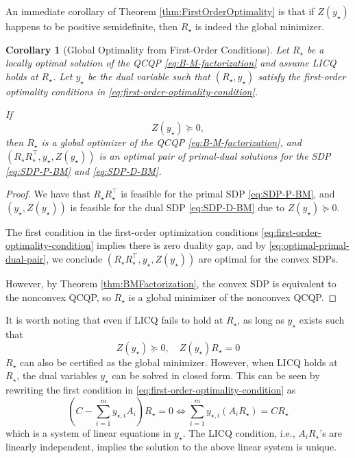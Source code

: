 \documentclass[
]{book}
\newtheorem{corollary}{Corollary}[chapter]
\theoremstyle{definition}
\theoremstyle{definition}
\theoremstyle{definition}
\theoremstyle{definition}
\theoremstyle{remark}
\begin{document}
An immediate corollary of Theorem \ref{thm:FirstOrderOptimality} is that if \(Z(y_\star)\) happens to be positive semidefinite, then \(R_\star\) is indeed the global minimizer.

\begin{corollary}[Global Optimality from First-Order Conditions]
\protect\hypertarget{cor:GlobalOptimality}{}\label{cor:GlobalOptimality}Let \(R_\star\) be a locally optimal solution of the QCQP \eqref{eq:B-M-factorization} and assume LICQ holds at \(R_\star\). Let \(y_\star\) be the dual variable such that \((R_\star,y_\star)\) satisfy the first-order optimality conditions in \eqref{eq:first-order-optimality-condition}.

If
\[
Z(y_\star) \succeq 0,
\]
then \(R_\star\) is a global optimizer of the QCQP \eqref{eq:B-M-factorization}, and \((R_\star R_\star^\top, y_\star, Z(y_\star))\) is an optimal pair of primal-dual solutions for the SDP \eqref{eq:SDP-P-BM} and \eqref{eq:SDP-D-BM}.
\end{corollary}

\begin{proof}
We have that \(R_\star R_\star^\top\) is feasible for the primal SDP \eqref{eq:SDP-P-BM}, and \((y_\star, Z(y_\star))\) is feasible for the dual SDP \eqref{eq:SDP-D-BM} due to \(Z(y_\star) \succeq 0\).

The first condition in the first-order optimization conditions \eqref{eq:first-order-optimality-condition} implies there is zero duality gap, and by \eqref{eq:optimal-primal-dual-pair}, we conclude \((R_\star R_\star^\top, y_\star, Z(y_\star))\) are optimal for the convex SDPs.

However, by Theorem \ref{thm:BMFactorization}, the convex SDP is equivalent to the nonconvex QCQP, so \(R_\star\) is a global minimizer of the nonconvex QCQP.
\end{proof}

It is worth noting that even if LICQ fails to hold at \(R_\star\), as long as \(y_\star\) exists such that
\[
Z(y_\star) \succeq 0, \quad Z(y_\star) R_\star = 0
\]
\(R_\star\) can also be certified as the global minimizer.
However, when LICQ holds at \(R_\star\), the dual variables \(y_\star\) can be solved in closed form. This can be seen by rewriting the first condition in \eqref{eq:first-order-optimality-condition} as
\begin{equation}
\left( C - \sum_{i=1}^m y_{\star,i} A_i \right) R_\star = 0 \Leftrightarrow \sum_{i=1}^m y_{\star,i} (A_i R_\star) = C R_\star
\label{eq:solve-dual-y-linear-system}
\end{equation}
which is a system of linear equations in \(y_\star\). The LICQ condition, i.e., \(A_i R_\star\)'s are linearly independent, implies the solution to the above linear system is unique.
\end{document}
